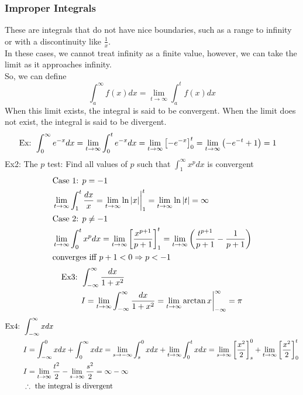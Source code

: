 \documentclass[11pt, fleqn]{article}
\begin{document}
\subsubsection{Improper Integrals}
These are integrals that do not have nice boundaries, such as a range to infinity or with a discontinuity like $\frac{1}{x}$.\\
In these cases, we cannot treat infinity as a finite value, however, we can take the limit as it approaches infinity.\\
So, we can define
$$\int_a^\infty f(x)dx=\lim_{t\to\infty}\int_a^t f(x)dx$$
When this limit exists, the integral is said to be convergent. When the limit does not exist, the integral is said to be divergent.\\
\begin{align*}
    \text{Ex: }&\int_0^\infty e^{-x}dx=\lim_{t\to\infty}\int_0^te^{-x}dx=\lim_{t\to\infty}\left[ -e^{-x} \right]_0^t=\lim_{t\to\infty}\left( -e^{-t}+1 \right)=1
\end{align*}
Ex2: The $p$ test: Find all values of $p$ such that $\int_1^\infty x^pdx$ is convergent
\begin{align*}
    &\text{Case 1: }p=-1\\
    &\lim_{t\to\infty}\int_1^t\frac{dx}{x}=\lim_{t\to\infty}{\ln|x|}\bigg\vert_1^t=\lim_{t\to\infty}\ln|t|=\infty\\
    &\text{Case 2: }p\neq -1\\
    &\lim_{t\to\infty}\int_0^tx^pdx=\lim_{t\to\infty}\left[ \frac{x^{p+1}}{p+1} \right]_1^t=\lim_{t\to\infty}\left( \frac{t^{p+1}}{p+1}-\frac{1}{p+1} \right)\\
    &\text{converges iff }p+1<0\Rightarrow p<-1
\end{align*}
\begin{align*}
    \text{Ex3: }&\int_{-\infty}^\infty\frac{dx}{1+x^2}\\
    &I=\lim_{t\to\infty}\int_{-\infty}^\infty\frac{dx}{1+x^2}=\lim_{t\to\infty}{\arctan x}\bigg\vert_{-\infty}^\infty=\pi
\end{align*}
\begin{align*}
    \text{Ex4: }&\int_{-\infty}^\infty xdx\\
    &I=\int_{-\infty}^0xdx+\int_0^\infty xdx=\lim_{s\to-\infty}\int_s^0xdx+\lim_{t\to\infty}\int_0^txdx=\lim_{s\to\infty}\left[ \frac{x^2}{2} \right]_s^0+\lim_{t\to\infty}\left[ \frac{x^2}{2} \right]_0^t\\
    &I=\lim_{t\to\infty}\frac{t^2}{2}-\lim_{s\to\infty}\frac{s^2}{2}=\infty-\infty\\
    &\therefore \text{ the integral is divergent}
\end{align*}
\end{document}
